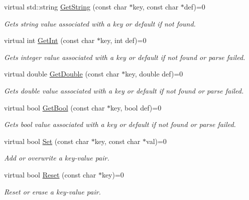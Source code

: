 \begin{DoxyCompactItemize}
\item 
virtual std\+::string \hyperlink{classIBaIniParser_a94c36d5c60509da2bd75a986860974d8}{Get\+String} (const char $\ast$key, const char $\ast$def)=0
\begin{DoxyCompactList}\small\item\em Gets string value associated with a key or default if not found. \end{DoxyCompactList}\item 
virtual int \hyperlink{classIBaIniParser_a6e9a78448d75a37ec68b049bd45958e9}{Get\+Int} (const char $\ast$key, int def)=0
\begin{DoxyCompactList}\small\item\em Gets integer value associated with a key or default if not found or parse failed. \end{DoxyCompactList}\item 
virtual double \hyperlink{classIBaIniParser_aceab5e35ec6832bd9ccf35ad1486ca7b}{Get\+Double} (const char $\ast$key, double def)=0
\begin{DoxyCompactList}\small\item\em Gets double value associated with a key or default if not found or parse failed. \end{DoxyCompactList}\item 
virtual bool \hyperlink{classIBaIniParser_a3be3b69c9628a1d225187f52bb6d8d4d}{Get\+Bool} (const char $\ast$key, bool def)=0
\begin{DoxyCompactList}\small\item\em Gets bool value associated with a key or default if not found or parse failed. \end{DoxyCompactList}\item 
virtual bool \hyperlink{classIBaIniParser_ad60d8188d917a3fb43326be775e87b08}{Set} (const char $\ast$key, const char $\ast$val)=0
\begin{DoxyCompactList}\small\item\em Add or overwrite a key-\/value pair. \end{DoxyCompactList}\item 
virtual bool \hyperlink{classIBaIniParser_a0ca9abb74bbddfc4ec2f1a4b67454189}{Reset} (const char $\ast$key)=0
\begin{DoxyCompactList}\small\item\em Reset or erase a key-\/value pair. \end{DoxyCompactList}\item 

\end{DoxyCompactItemize}
